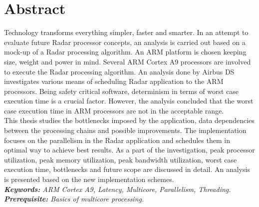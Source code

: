 \chapter*{Abstract}
\label{chap:abstract}

%
Technology transforms everything simpler, faster and smarter. In an attempt to evaluate future Radar processor concepts, an analysis is carried out based on a mock-up of a Radar processing algorithm. An ARM platform is chosen keeping size, weight and power in mind. Several ARM Cortex A9 processors are involved to execute the Radar processing algorithm. An analysis done by Airbus DS investigates various means of scheduling Radar application to the ARM processors. Being safety critical software, determinism in terms of worst case execution time is a crucial factor. However, the analysis concluded that the worst case execution time in ARM processors are not in the acceptable range.\\

This thesis studies the bottlenecks imposed by the application, data dependencies between the processing chains and possible improvements. The implementation focuses on the parallelism in the Radar application and schedules them in optimal way to achieve best results. As a part of the investigation, peak processor utilization, peak memory utilization, peak bandwidth utilization, worst case execution time, bottlenecks and future scope are discussed in detail. An analysis is presented based on the new implementation schemes.\\

\noindent
\textsl{\textbf{Keywords:} ARM Cortex A9, Latency, Multicore, Parallelism, Threading.} \\

\noindent
\textsl{\textbf{Prerequisite:} Basics of multicore processing.}\\
